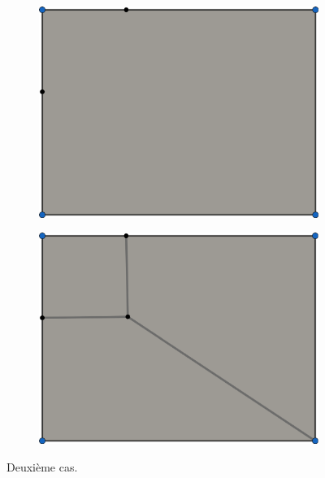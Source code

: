 \begin{figure}[h!]
\centering
\begin{subfigure}{0.49\textwidth}
    \includegraphics[width=\textwidth]{images/limit_cycle_3.pdf}
\end{subfigure}
\hfill
\begin{subfigure}{0.49\textwidth}
    \includegraphics[width=\textwidth]{images/limit_cycle_4.pdf}
\end{subfigure}
\caption{Deuxième cas.}
\label{fig:cycle_2}
\end{figure}


